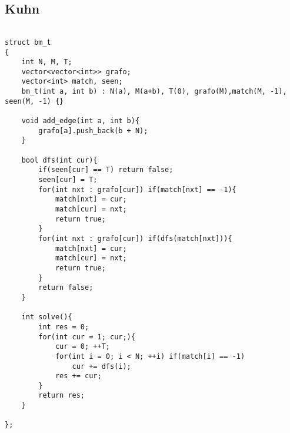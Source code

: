 \documentclass[11pt, a4paper, twoside]{article}
\begin{document}
\subsection{Kuhn}
\begin{verbatim}

struct bm_t
{
    int N, M, T;
    vector<vector<int>> grafo;
    vector<int> match, seen;
    bm_t(int a, int b) : N(a), M(a+b), T(0), grafo(M),match(M, -1), seen(M, -1) {}
        
    void add_edge(int a, int b){
        grafo[a].push_back(b + N);
    }
    
    bool dfs(int cur){
        if(seen[cur] == T) return false;
        seen[cur] = T;
        for(int nxt : grafo[cur]) if(match[nxt] == -1){
            match[nxt] = cur;
            match[cur] = nxt;
            return true;
        }
        for(int nxt : grafo[cur]) if(dfs(match[nxt])){
            match[nxt] = cur;
            match[cur] = nxt;
            return true;
        }
        return false;
    }
    
    int solve(){
        int res = 0;
        for(int cur = 1; cur;){
            cur = 0; ++T;
            for(int i = 0; i < N; ++i) if(match[i] == -1)
                cur += dfs(i);
            res += cur;
        }
        return res;
    }
    
};
\end{verbatim}
\end{document}
